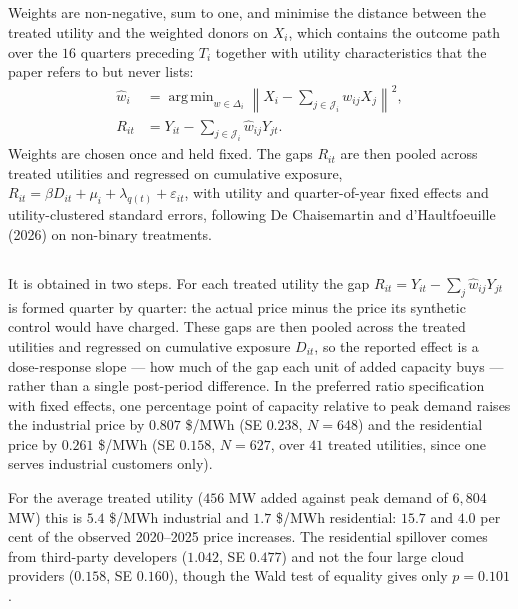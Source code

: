 \documentclass[11pt]{article}
\DeclareMathOperator*{\argmin}{arg\,min}
\begin{document}
\subsection{}
Weights are non-negative, sum to one, and minimise the distance between the
treated utility and the weighted donors on $X_i$, which contains the outcome
path over the $16$ quarters preceding $T_i$ together with utility
characteristics that the paper refers to but never lists:
\begin{align*}
\hat{w}_i &= \argmin_{w \in \Delta_i}
\left\| X_i - \sum_{j \in \mathcal{J}_i} w_{ij}X_j \right\|^2 , \\
R_{it} &= Y_{it} - \sum_{j \in \mathcal{J}_i} \hat{w}_{ij} Y_{jt}.
\end{align*}
Weights are chosen once and held fixed. The gaps $R_{it}$ are then pooled
across treated utilities and regressed on cumulative exposure,
$R_{it} = \beta D_{it} + \mu_i + \lambda_{q(t)} + \varepsilon_{it}$, with
utility and quarter-of-year fixed effects and utility-clustered standard
errors, following De Chaisemartin and d'Haultfoeuille (2026) on non-binary
treatments.

\subsection{}
It is obtained in two steps. For each treated utility the gap
$R_{it} = Y_{it} - \sum_j \hat{w}_{ij}Y_{jt}$ is formed quarter by quarter: the
actual price minus the price its synthetic control would have charged. These
gaps are then pooled across the treated utilities and regressed on cumulative
exposure $D_{it}$, so the reported effect is a dose-response slope --- how much
of the gap each unit of added capacity buys --- rather than a single
post-period difference. In the preferred ratio
specification with fixed effects, one percentage point of capacity relative to
peak demand raises the industrial price by $0.807$ \$/MWh (SE $0.238$,
$N = 648$) and the residential price by $0.261$ \$/MWh (SE $0.158$,
$N = 627$, over $41$ treated utilities, since one serves industrial customers
only).

For the average treated utility ($456$ MW added against peak demand of
$6{,}804$ MW) this is $5.4$ \$/MWh industrial and $1.7$ \$/MWh residential:
$15.7$ and $4.0$ per cent of the observed 2020--2025 price increases. The
residential spillover comes from third-party developers ($1.042$, SE $0.477$)
and not the four large cloud providers ($0.158$, SE $0.160$), though the Wald
test of equality gives only $p = 0.101$.
\end{document}
